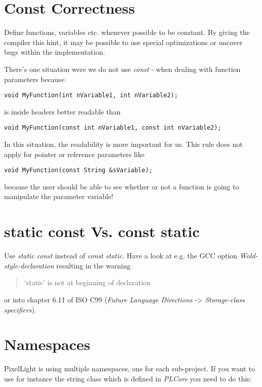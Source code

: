 \section{Const Correctness}
Define functions, variables etc. whenever possible to be constant. By giving the compiler this hint, it may be possible to use special optimizations or uncover bugs within the implementation.

There's one situation were we do not use \emph{const} - when dealing with function parameters because

\begin{lstlisting}[caption=Function parameters]
void MyFunction(int nVariable1, int nVariable2);
\end{lstlisting}

is inside headers better readable than

\begin{lstlisting}[caption=Constant function parameters]
void MyFunction(const int nVariable1, const int nVariable2);
\end{lstlisting}

In this situation, the readability is more important for us. This rule does not apply for pointer or reference parameters like

\begin{lstlisting}[caption=Constant function pointer/reference parameter]
void MyFunction(const String &sVariable);
\end{lstlisting}

because the user should be able to see whether or not a function is going to manipulate the parameter variable!




\section{static const Vs. const static}
Use \emph{static const} instead of \emph{const static}. Have a look at e.g. the GCC option \emph{Wold-style-declaration} resulting in the warning \begin{quote}`static' is not at beginning of declaration\end{quote} or into chapter 6.11 of ISO C99 (\emph{Future Language Directions} -> \emph{Storage-class specifiers}).




\section{Namespaces}
PixelLight is using multiple namespaces, one for each sub-project. If you want to use for instance the string class which is defined in \emph{PLCore} you need to do this:

